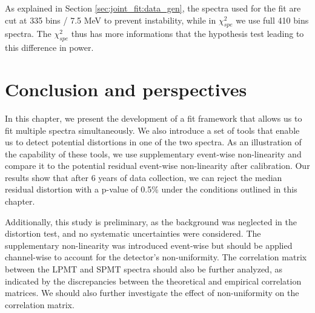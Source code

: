 \documentclass[../main.tex]{subfiles}
\begin{document}
As explained in Section \ref{sec:joint_fit:data_gen}, the spectra used for the fit are cut at 335 bins / 7.5 MeV to prevent instability, while in $\chi^2_{spe}$ we use full 410 bins spectra. The $\chi^2_{spe}$ thus has more informations that the hypothesis test leading to this difference in power.


%
%
%
%
%

\section{Conclusion and perspectives}
\label{sec:joint_fit:conclusion}

In this chapter, we present the development of a fit framework that allows us to fit multiple spectra simultaneously. We also introduce a set of tools that enable us to detect potential distortions in one of the two spectra. As an illustration of the capability of these tools, we use supplementary event-wise non-linearity and compare it to the potential residual event-wise non-linearity after calibration. Our results show that after 6 years of data collection, we can reject the median residual distortion with a p-value of 0.5\% under the conditions outlined in this chapter.

Additionally, this study is preliminary, as the background was neglected in the distortion test, and no systematic uncertainties were considered. The supplementary non-linearity was introduced event-wise but should be applied channel-wise to account for the detector's non-uniformity. The correlation matrix between the LPMT and SPMT spectra should also be further analyzed, as indicated by the discrepancies between the theoretical and empirical correlation matrices. We should also further investigate the effect of non-uniformity on the correlation matrix.
\end{document}
